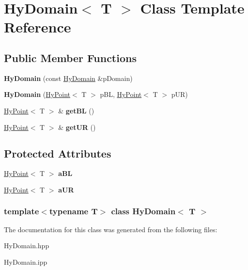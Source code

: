 \hypertarget{classHyDomain}{
\section{HyDomain$<$ T $>$ Class Template Reference}
\label{classHyDomain}
}
\subsection*{Public Member Functions}
\begin{DoxyCompactItemize}
\item 
\hypertarget{classHyDomain_a78c1bc2d22889c85bbfc97fc9a5c7f47}{
{\bfseries HyDomain} (const \hyperlink{classHyDomain}{HyDomain} \&pDomain)}
\label{classHyDomain_a78c1bc2d22889c85bbfc97fc9a5c7f47}

\item 
\hypertarget{classHyDomain_af225dd17835a2edfabf1ac0a71e29100}{
{\bfseries HyDomain} (\hyperlink{classHyPoint}{HyPoint}$<$ T $>$ pBL, \hyperlink{classHyPoint}{HyPoint}$<$ T $>$ pUR)}
\label{classHyDomain_af225dd17835a2edfabf1ac0a71e29100}

\item 
\hypertarget{classHyDomain_a80dc12dbe00d07a91176c8e0b6d4279d}{
\hyperlink{classHyPoint}{HyPoint}$<$ T $>$ \& {\bfseries getBL} ()}
\label{classHyDomain_a80dc12dbe00d07a91176c8e0b6d4279d}

\item 
\hypertarget{classHyDomain_aaf438198d089dcead1a695da5527e5e3}{
\hyperlink{classHyPoint}{HyPoint}$<$ T $>$ \& {\bfseries getUR} ()}
\label{classHyDomain_aaf438198d089dcead1a695da5527e5e3}

\end{DoxyCompactItemize}
\subsection*{Protected Attributes}
\begin{DoxyCompactItemize}
\item 
\hypertarget{classHyDomain_ad9d2958f0843f21478075c8f7547d486}{
\hyperlink{classHyPoint}{HyPoint}$<$ T $>$ {\bfseries aBL}}
\label{classHyDomain_ad9d2958f0843f21478075c8f7547d486}

\item 
\hypertarget{classHyDomain_a6423102e3c063a7c5b5202e4a1b35a2f}{
\hyperlink{classHyPoint}{HyPoint}$<$ T $>$ {\bfseries aUR}}
\label{classHyDomain_a6423102e3c063a7c5b5202e4a1b35a2f}

\end{DoxyCompactItemize}
\subsubsection*{template$<$typename T$>$ class HyDomain$<$ T $>$}



The documentation for this class was generated from the following files:\begin{DoxyCompactItemize}
\item 
HyDomain.hpp\item 
HyDomain.ipp\end{DoxyCompactItemize}
